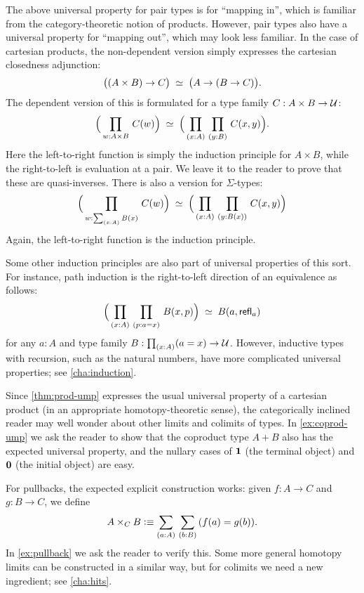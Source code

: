 The above universal property for pair types is for ``mapping in'', which is familiar from the category-theoretic notion of products.
However, pair types also have a universal property for ``mapping out'', which may look less familiar.
In the case of cartesian products, the non-dependent version simply expresses the cartesian closedness adjunction:
\[ \big((A\times B) \to C\big) \;\simeq\; \big(A\to (B\to C)\big).\]
The dependent version of this is formulated for a type family $C:A\times B\to \mathcal{U}$:
\[ \eqvspaced{\Big(\prd{w:A\times B} C(w)\Big)}{\Big(\prd{x:A}{y:B} C(x,y)\Big)}. \]
Here the left-to-right function is simply the induction principle for $A\times B$, while the right-to-left is evaluation at a pair.
We leave it to the reader to prove that these are quasi-inverses.
There is also a version for $\Sigma$-types:
\begin{equation}
  \eqvspaced{\Big(\prd{w:\sm{x:A} B(x)} C(w)\Big)}{\Big(\prd{x:A}{y:B(x)} C(x,y)\Big)}\label{eq:sigma-lump}
\end{equation}
Again, the left-to-right function is the induction principle.

Some other induction principles are also part of universal properties of this sort.
For instance, path induction is the right-to-left direction of an equivalence as follows:
\begin{equation}
  \label{eq:path-lump}
  \eqvspaced{\Big(\prd{x:A}{p:a=x} B(x,p)\Big)}{B(a,\refl a)}
\end{equation}
for any $a:A$ and type family $B:\prd{x:A} (a=x) \to\type$.
However, inductive types with recursion, such as the natural numbers, have more complicated universal properties; see \autoref{cha:induction}.

Since \autoref{thm:prod-ump} expresses the usual universal property of a cartesian product (in an appropriate homotopy-theoretic sense), the categorically inclined reader may well wonder about other limits and colimits of types.
In \autoref{ex:coprod-ump} we ask the reader to show that the coproduct type $A+B$ also has the expected universal property, and the nullary cases of $\mathbf{1}$ (the terminal object) and $\mathbf{0}$ (the initial object) are easy.

For pullbacks, the expected explicit construction works: given $f:A\to C$ and $g:B\to C$, we define
\begin{equation}
  A\times_C B \defeq \sm{a:A}{b:B} (f(a)=g(b)).\label{eq:defn-pullback}
\end{equation}
In \autoref{ex:pullback} we ask the reader to verify this.
Some more general homotopy limits can be constructed in a similar way, but for colimits we need a new ingredient; see \autoref{cha:hits}.


